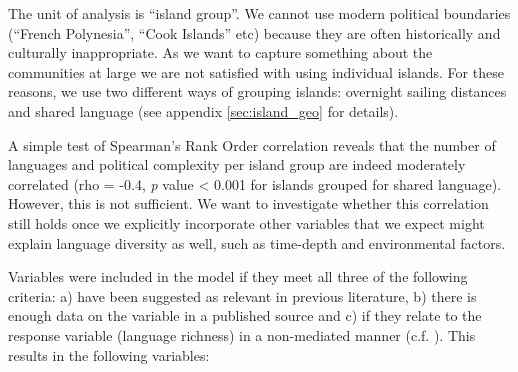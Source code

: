 \documentclass[unnumsec,webpdf,modern,medium]{oup-authoring-template}
\begin{document}
The unit of analysis is ``island group''. We cannot use modern political boundaries (``French Polynesia'', ``Cook Islands'' etc) because they are often historically and culturally inappropriate. As we want to capture something about the communities at large we are not satisfied with using individual islands. For these reasons, we use two different ways of grouping islands: overnight sailing distances and shared language (see appendix \ref{sec:island_geo} for details).


A simple test of Spearman's Rank Order correlation reveals that the number of languages and political complexity per island group are indeed moderately correlated (rho  = -0.4, \emph{p} value < 0.001 for islands grouped for shared language). However, this is not sufficient. We want to investigate whether this correlation still holds once we explicitly incorporate other variables that we expect might explain language diversity as well, such as time-depth and environmental factors. 

Variables were included in the model if they meet all three of the following criteria: a) have been suggested as relevant in previous literature, b) there is enough data on the variable in a published source and c) if they relate to the response variable (language richness) in a non-mediated manner (c.f. \citet{pearl1995causal}). This results in the following variables:
\end{document}
